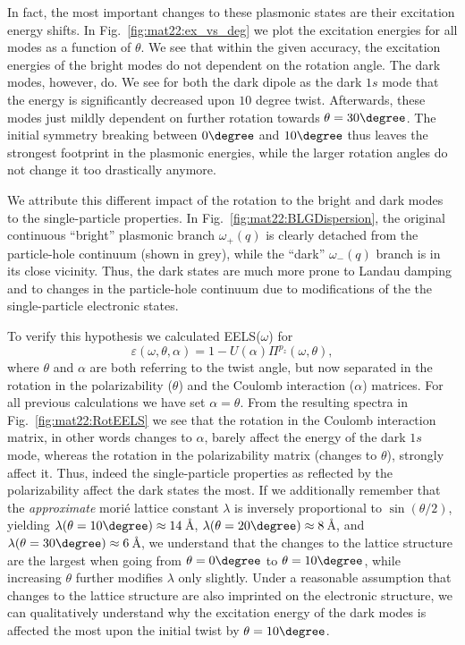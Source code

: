 
In fact, the most important changes to these plasmonic states are their excitation energy shifts. In Fig.~\ref{fig:mat22:ex_vs_deg} we plot the excitation energies for all modes as a function of $\theta$. We see that within the given accuracy, the excitation energies of the bright modes do not dependent on the rotation angle. The dark modes, however, do. We see for both the dark dipole as the dark $1s$ mode that the energy is significantly decreased upon $10$ degree twist. Afterwards, these modes just mildly dependent on further rotation towards $\theta=30\degree$. The initial symmetry breaking between $0\degree$ and $10\degree$ thus leaves the strongest footprint in the plasmonic energies, while the larger rotation angles do not change it too drastically anymore. 

We attribute this different impact of the rotation to the bright and dark modes to the single-particle properties. In Fig.~\ref{fig:mat22:BLGDispersion}, the original continuous ``bright'' plasmonic branch $\omega_+(q)$ is clearly detached from the particle-hole continuum (shown in grey), while the ``dark'' $\omega_-(q)$ branch is in its close vicinity. Thus, the dark states are much more prone to Landau damping and to changes in the particle-hole continuum due to modifications of the the single-particle electronic states. 

To verify this hypothesis we calculated EELS($\omega$) for
\begin{equation*}
    \varepsilon(\omega, \theta, \alpha) = 1 - U(\alpha) \Pi^{p_z}(\omega, \theta),
\end{equation*}
where $\theta$ and $\alpha$ are both referring to the twist angle, but now separated in the rotation in the polarizability ($\theta$) and the Coulomb interaction ($\alpha$) matrices. For all previous calculations we have set $\alpha = \theta$. From the resulting spectra in Fig.~\ref{fig:mat22:RotEELS} we see that the rotation in the Coulomb interaction matrix, in other words changes to $\alpha$, barely affect the energy of the dark $1s$ mode, whereas the rotation in the polarizability matrix (changes to $\theta$), strongly affect it. Thus, indeed the single-particle properties as reflected by the polarizability affect the dark states the most. If we additionally remember that the \emph{approximate} mori\'{e} lattice constant $\lambda$ is inversely proportional to $\sin(\theta/2)$, yielding $\lambda(\theta=10\degree) \approx 14\,$\AA, $\lambda(\theta=20\degree) \approx 8\,$\AA, and $\lambda(\theta=30\degree) \approx 6\,$\AA, we understand that the changes to the lattice structure are the largest when going from $\theta=0\degree$ to $\theta=10\degree$, while increasing $\theta$ further modifies $\lambda$ only slightly. Under a reasonable assumption that changes to the lattice structure are also imprinted on the electronic structure, we can qualitatively understand why the excitation energy of the dark modes is affected the most upon the initial twist by $\theta=10\degree$.

